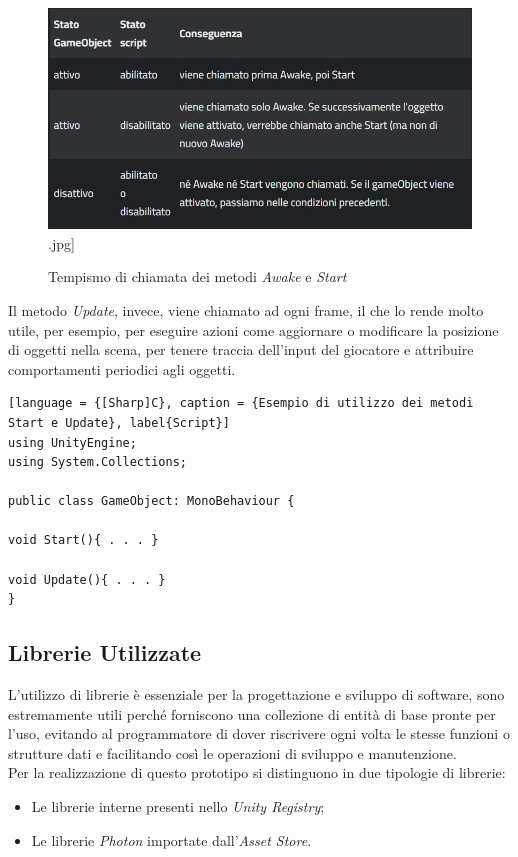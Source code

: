 \begin{figure}[H]
    \centering
    \includegraphics[scale = 0.6]{Immagini/Awake}.jpg]
    \caption{Tempismo di chiamata dei metodi \textit{Awake} e \textit{Start}}
    \label{fig:my_label}
\end{figure} 
\hspace{-0.6cm}Il metodo \textit{Update}, invece, viene chiamato ad ogni frame, il che lo rende molto utile, per esempio, per eseguire azioni come aggiornare o modificare la posizione di oggetti nella scena, per tenere traccia dell'input del giocatore e attribuire comportamenti periodici agli oggetti.
\begin{lstlisting}[language = {[Sharp]C}, caption = {Esempio di utilizzo dei metodi Start e Update}, label{Script}]
using UnityEngine;
using System.Collections;

public class GameObject: MonoBehaviour {

void Start(){ . . . }

void Update(){ . . . }
} 
\end{lstlisting}
\subsection{Librerie Utilizzate}
L'utilizzo di librerie è essenziale per la progettazione e sviluppo di software, sono estremamente utili perché forniscono una collezione di entità di base pronte per l'uso, evitando al programmatore di dover riscrivere ogni volta le stesse funzioni o strutture dati e facilitando così le operazioni di sviluppo e manutenzione.
\\Per la realizzazione di questo prototipo si distinguono in due tipologie di librerie:
\begin{itemize}
    \item Le librerie interne presenti nello \textit{\gls{Unity Registry}};
    \item Le librerie \textit{Photon} importate dall'\textit{\gls{Asset Store}}.
\end{itemize}
